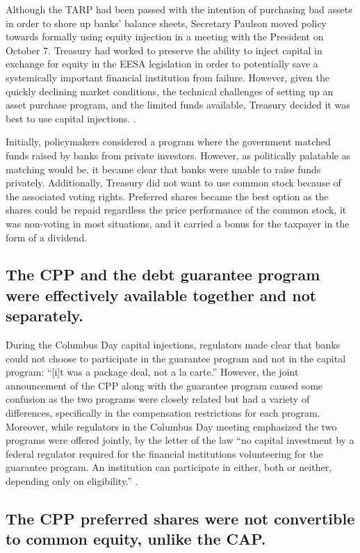 \documentclass[12pt]{article}
\begin{document}
Although the TARP had been passed with the intention of purchasing bad assets in order to shore up banks' balance sheets, Secretary Paulson moved policy towards formally using equity injection in a meeting with the President on October 7. Treasury had worked to preserve the ability to inject capital in exchange for equity in the EESA legislation in order to potentially save a systemically important financial institution from failure. However, given the quickly declining market conditions, the technical challenges of setting up an asset purchase program, and the limited funds available, Treasury decided it was best to use capital injections. \citep{paulsonbook}. 

Initially, policymakers considered a program where the government matched funds raised by banks from private investors. However, as politically palatable as matching would be, it became clear that banks were unable to raise funds privately. Additionally, Treasury did not want to use common stock because of the associated voting rights. Preferred shares became the best option as the shares could be repaid regardless the price performance of the common stock, it was non-voting in most situations, and it carried a bonus for the taxpayer in the form of a dividend. 

\subsection{The CPP and the debt guarantee program were effectively available together and not separately.}

During the Columbus Day capital injections, regulators made clear that banks could not choose to participate in the guarantee program and not in the capital program: ``[i]t was a package deal, not a la carte.'' However, the joint announcement of the CPP along with the guarantee program caused some confusion as the two programs were closely related but had a variety of differences, specifically in the compensation restrictions for each program. Moreover, while regulators in the Columbus Day meeting emphasized the two programs were offered jointly, by the letter of the law ``no capital investment by a federal regulator required for the financial institutions volunteering for the guarantee program. An institution can participate in either, both or neither, depending only on eligibility.'' \citep{mofoCap}. 

\subsection{The CPP preferred shares were not convertible to common equity, unlike the CAP.}
\end{document}
